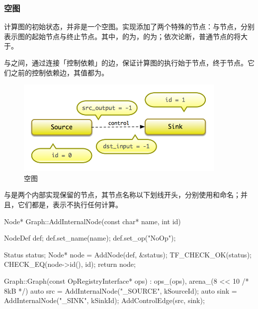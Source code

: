 \begin{content}
\subsubsection{空图}

计算图的初始状态，并非是一个空图。实现添加了两个特殊的节点：与节点，分别表示图的起始节点与终止节点。其中，的为，的为；依次论断，普通节点的将大于。

与之间，通过连接「控制依赖」的边，保证计算图的执行始于节点，终于节点。它们之前的控制依赖边，其值都为。

\begin{figure}[!htbp]
\centering
\includegraphics[width=0.9\textwidth]{figures/cc-empty-graph.png}
\caption{空图}
 \label{fig:cc-empty-graph}
\end{figure}

与是两个内部实现保留的节点，其节点名称以下划线开头，分别使用和命名；并且，它们都是，表示不执行任何计算。

\begin{leftbar}
\begin{c++}
Node* Graph::AddInternalNode(const char* name, int id) {
  NodeDef def;
  def.set_name(name);
  def.set_op("NoOp");

  Status status;
  Node* node = AddNode(def, &status);
  TF_CHECK_OK(status);
  CHECK_EQ(node->id(), id);
  return node;
}

Graph::Graph(const OpRegistryInterface* ops)
    : ops_(ops), arena_(8 << 10 /* 8kB */) {
  auto src  = AddInternalNode("_SOURCE", kSourceId);
  auto sink = AddInternalNode("_SINK",   kSinkId);
  AddControlEdge(src, sink);
}
\end{c++}
\end{leftbar}


\end{content}
